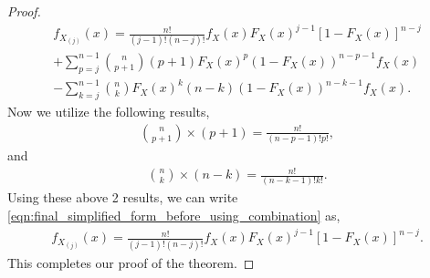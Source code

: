 \documentclass[a4paper,english,12pt]{article}
\begin{document}
\begin{proof}
\begin{align}
f_{X_{(j)}} (x)=\frac{n!}{(j-1)!(n-j)!} f_X (x) F_X (x) ^{j-1} [1 - F_X (x)]^{n-j}\nonumber \\ + {\sum\limits_{p=j}^{n-1}} \binom{n}{p+1} (p+1) F_X (x) ^{p} (1-F_X (x))^{n-p-1}f_X (x)\nonumber \\-{\sum\limits_{k=j}^{n-1}} \binom{n}{k} F_X (x) ^{k} (n-k) (1-F_X (x))^{n-k-1} f_X (x).
\end{align}
Now we utilize the following results,
\begin{align}
\binom{n}{p+1}\times (p+1)=\frac{n!}{(n-p-1)!p!}, \nonumber 
\end{align}
and
\begin{align}
\binom{n}{k}\times (n-k)=\frac{n!}{(n-k-1)!k!}. \nonumber 
\end{align}
Using these above 2 results, we can write \eqref{eqn:final_simplified_form_before_using_combination} as,
\begin{align}
f_{X_{(j)}} (x)=\frac{n!}{(j-1)!(n-j)!} f_X (x) F_X (x) ^{j-1} [1 - F_X (x)]^{n-j}.
\end{align}
This completes our proof of the theorem.
\end{proof}
\end{document}
